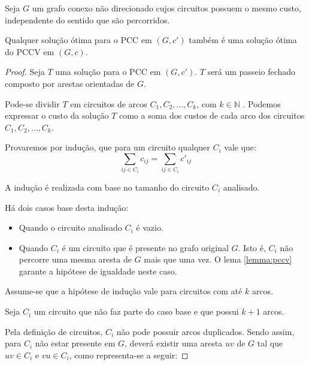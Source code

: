         \begin{theorem}
            \label{windy-theorem}
            Seja $G$ um grafo conexo não direcionado cujos circuitos possuem o mesmo custo, independente do sentido que são percorridos. 

            Qualquer solução ótima para o PCC em $(G, c')$ também é uma solução ótima do PCCV em $(G, c)$.

        \end{theorem}
        \begin{proof} 
            Seja $T$ uma solução para o PCC em $(G, c')$. 
            $T$ será um passeio fechado composto por arestas orientadas de $G$.

            Pode-se dividir $T$ em circuitos de arcos $C_1, C_2, \dots, C_k$, com $k \in \mathbb{N}$ . %
            Podemos expressar o custo da solução $T$ como a soma dos custos de cada arco dos circuitos $C_1, C_2, \dots, C_k$. 

            Provaremos por indução, que para um circuito qualquer $C_i$ vale que:
            \[
                \sum_{ij \in C_i} c_{ij} = \sum_{ij \in C_i} c'_{ij}
            \]

            A indução é realizada com base no tamanho do circuito $C_i$ analisado.

            Há dois casos base desta indução:

            \begin{itemize}
                \item Quando o circuito analisado $C_i$ é vazio.
                \item Quando $C_i$ é um circuito que é presente no grafo original $G$. 
                    Isto é, $C_i$ não percorre uma mesma aresta de $G$ mais que uma vez.
                    O lema \ref{lemma:pccv} garante a hipótese de igualdade neste caso.
            \end{itemize}

            Assume-se que a hipótese de indução vale para circuitos com até $k$ arcos.

            Seja $C_i$ um circuito que não faz parte do caso base e que possui $k+1$ arcos.

            Pela definição de circuitos, $C_i$ não pode possuir arcos duplicados.  %
            Sendo assim, para $C_i$ não estar presente em $G$, deverá existir uma aresta $uv$ de $G$ tal que $uv \in C_i$ e $vu \in C_i$, como representa-se a seguir:


\end{proof}
